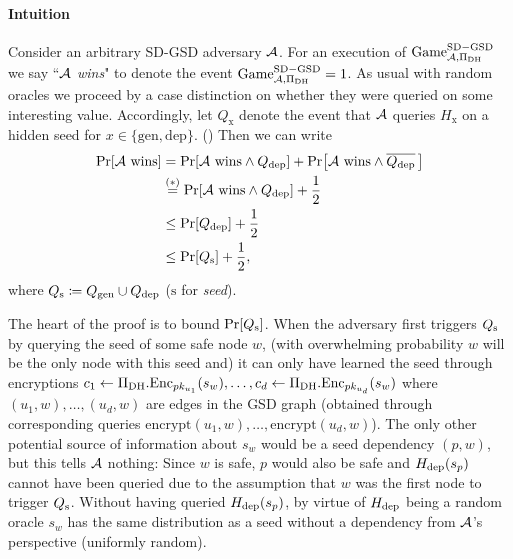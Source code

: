 \paragraph{Intuition}
Consider an arbitrary SD-GSD adversary $\mathcal{A}$. For an execution of $\mathrm{Game}_{\mathcal{A}, \Pi_{\mathrm{DH}}}^{\mathrm{SD-GSD}}$ we say ``\emph{$\mathcal{A}$ wins}" to denote the event $\mathrm{Game}_{\mathcal{A}, \Pi_{\mathrm{DH}}}^{\mathrm{SD-GSD}} = 1$.
As usual with random oracles we proceed by a case distinction on whether they were queried on some interesting value. Accordingly, let $Q_{\mathrm{x}}$ denote the event that $\mathcal{A}$ queries $H_{\mathrm{x}}$ on a hidden seed for $x \in \{\mathrm{gen}, \mathrm{dep}\}$. () Then we can write
\begin{align} \label{eq:theorem-sd-gsd-security-win-cases}
	\begin{split}
		\pr{\wins} & = \pr{\wins \land \qdep} + \pr{\wins \land \overline{\qdep} \,} \\
		& \stackrel{(*)}{=}  \pr{\wins \land \qdep} + \frac{1}{2}         \\
		& \le \pr{\qdep} + \frac{1}{2} \\
		& \le \pr{\qs} + \frac{1}{2},
	\end{split}
\end{align}
where $Q_\mathrm{s} \coloneqq Q_\mathrm{gen} \cup Q_\mathrm{dep}$ ($\mathrm{s}$ for \emph{seed}).



The heart of the proof is to bound $\pr{\qs}$. When the adversary first triggers $Q_\mathrm{s}$ by querying the seed of some safe node $w$, (with overwhelming probability $w$ will be the only node with this seed and) it can only have learned the seed through encryptions
$c_1 \leftarrow \Pi_{\mathrm{DH}}.\mathrm{Enc}_{pk_{u_1}}(s_w), \ldots, c_d \leftarrow \Pi_{\mathrm{DH}}.\mathrm{Enc}_{pk_{u_d}}(s_w)$
where $(u_1, w), \ldots, (u_d, w)$ are edges in the GSD graph (obtained through corresponding queries $\mathrm{encrypt}(u_1, w), \ldots, \mathrm{encrypt}(u_d, w)$). The only other potential source of information about $s_w$ would be a seed dependency $(p, w)$, but this tells $\mathcal{A}$ nothing: Since $w$ is safe, $p$ would also be safe and $H_\mathrm{dep}(s_p)$ cannot have been queried due to the assumption that $w$ was the first node to trigger $Q_\mathrm{s}$. Without having queried $H_\mathrm{dep}(s_p)$, by virtue of $H_\mathrm{dep}$ being a random oracle $s_w$ has the same distribution as a seed without a dependency from $\mathcal{A}$'s perspective (uniformly random).

